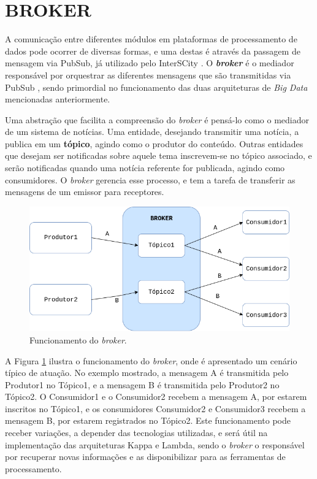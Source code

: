 \section{BROKER}

A comunicação entre diferentes módulos em plataformas de processamento de dados
pode ocorrer de diversas formas, e uma destas é através da passagem
de mensagem via PubSub, já utilizado pelo InterSCity \cite{delesposte2017}.
O \textbf{\textit{broker}} é o mediador responsável por orquestrar as diferentes
mensagens que são transmitidas via PubSub \cite{marz2015}, sendo primordial no
funcionamento das duas arquiteturas de \textit{Big Data} mencionadas anteriormente.

Uma abstração que facilita a compreensão do \textit{broker} é pensá-lo como o
mediador de um sistema de notícias. Uma entidade, desejando transmitir
uma notícia, a publica em um \textbf{tópico}, agindo como o produtor do
conteúdo. Outras entidades que desejam ser notificadas sobre aquele tema
inscrevem-se no tópico associado, e serão notificadas quando uma notícia referente
for publicada, agindo como consumidores. O \textit{broker} gerencia esse
processo, e tem a tarefa de transferir as mensagens de um emissor para
receptores.

\begin{figure}
  \centering
    \includegraphics[scale=0.5]{figuras/broker.png}
    \caption{Funcionamento do \textit{broker}.}
  \label{fig:broker}
\end{figure}

A Figura \ref{fig:broker} ilustra o funcionamento do \textit{broker}, onde é
apresentado um cenário típico de atuação. No exemplo mostrado, a mensagem A
é transmitida pelo Produtor1 no Tópico1, e a mensagem B é transmitida pelo
Produtor2 no Tópico2. O Consumidor1 e o Consumidor2 recebem a mensagem A, por
estarem inscritos no Tópico1, e os consumidores Consumidor2 e Consumidor3
recebem a mensagem B, por estarem registrados no Tópico2. Este funcionamento
pode receber variações, a depender das tecnologias utilizadas, e será útil
na implementação das arquiteturas Kappa e Lambda, sendo o
\textit{broker} o responsável por recuperar novas informações e as
disponibilizar para as ferramentas de processamento.

